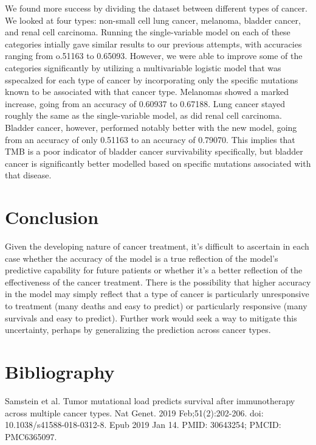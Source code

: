 \documentclass{article}
\begin{document}
We found more success by dividing the dataset between different types of cancer. We looked at four types: non-small cell lung cancer, melanoma, bladder cancer, and renal cell carcinoma. Running the single-variable model on each of these categories intially gave similar results to our previous attempts, with accuracies ranging from o.51163 to 0.65093. However, we were able to improve some of the categories significantly by utilizing a multivariable logistic model that was sspecalzed for each type of cancer by incorporating only the specific mutations known to be associated with that cancer type. Melanomas showed a marked increase, going from an accuracy of 0.60937 to 0.67188. Lung cancer stayed roughly the same as the single-variable model, as did renal cell carcinoma. Bladder cancer, however, performed notably better with the new model, going from an accuracy of only 0.51163 to an accuracy of 0.79070. This implies that TMB is a poor indicator of bladder cancer survivability specifically, but bladder cancer is significantly better modelled based on specific mutations associated with that disease.
\section{Conclusion}
Given the developing nature of cancer treatment, it's difficult to ascertain in each case whether the accuracy of the model is a true reflection of the model's predictive capability for future patients or whether it's a better reflection of the effectiveness of the cancer treatment. There is the possibility that higher accuracy in the model may simply reflect that a type of cancer is particularly unresponsive to treatment (many deaths and easy to predict) or particularly responsive (many survivals and easy to predict). Further work would seek a way to mitigate this uncertainty, perhaps by generalizing the prediction across cancer types.
\section{Bibliography}
Samstein et al. Tumor mutational load predicts survival after immunotherapy across multiple cancer types. Nat Genet. 2019 Feb;51(2):202-206. doi: 10.1038/s41588-018-0312-8. Epub 2019 Jan 14. PMID: 30643254; PMCID: PMC6365097.
\end{document}
